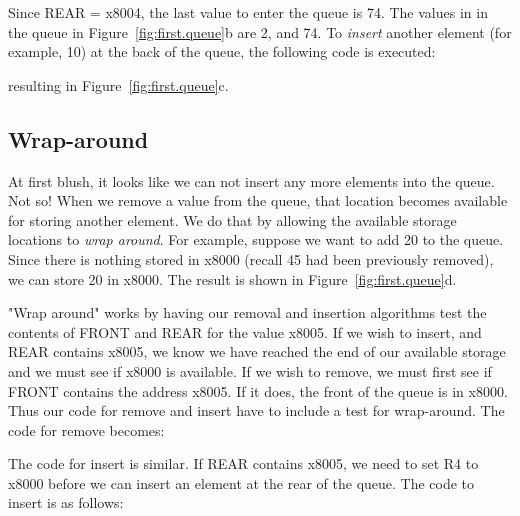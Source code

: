 \documentclass{patt}
\begin{document}
Since REAR = x8004, the last value to enter the queue is 74.  The values in
in the queue in Figure~\ref{fig:first.queue}b are 2, and 74.  To 
{\em insert} another element (for example, 10) at the back of the queue, 
the following code is executed:


\noindent
resulting in Figure~\ref{fig:first.queue}c.

\subsection{Wrap-around}

At first blush, it looks like we can not insert any more elements into the 
queue.  Not so!  When we remove a value from the queue, that location becomes 
available for storing another element.  We do that by allowing the available 
storage locations to {\em wrap around}.  For example, suppose we want to add 
20 to the queue.  Since there is nothing stored in x8000 (recall 45 had been
previously removed), we can store 20 in x8000.  The result is shown in 
Figure~\ref{fig:first.queue}d.  

"Wrap around" works by having our removal and insertion algorithms test the
contents of FRONT and REAR for the value x8005.  If we wish to insert, and
REAR contains x8005, we know we have reached the end of our available storage
and we must see if x8000 is available.  If we wish to remove, we must first
see if FRONT contains the address x8005.  If it does, the front of the queue
is in x8000.  Thus our code for remove and insert have to include a test for
wrap-around.  The code for remove becomes:


The code for insert is similar.  If REAR contains x8005, we need to set 
R4 to x8000 before we can insert an element at the rear of the queue.  The
code to insert is as follows:
\end{document}
